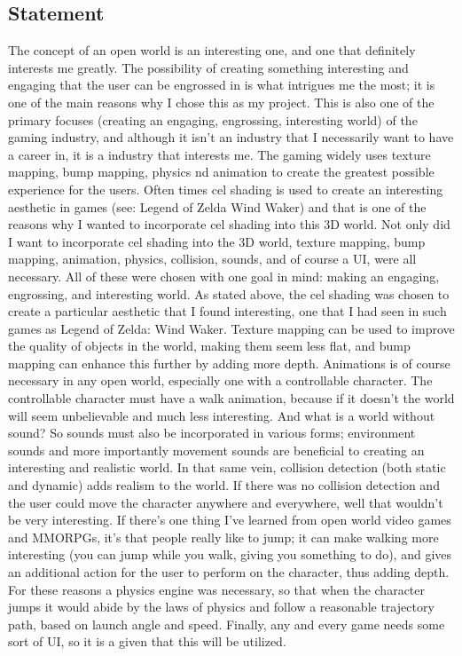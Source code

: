 \documentclass {article}
\begin{document}
\subsection{Statement}
The concept of an open world is an interesting one, and one that definitely interests me greatly. The possibility of creating something interesting and engaging that the user can be engrossed in is what intrigues me the most; it is one of the main reasons why I chose this as my project. This is also one of the primary focuses (creating an engaging, engrossing, interesting world) of the gaming industry, and although it isn't an industry that I necessarily want to have a career in, it is a industry that interests me. The gaming widely uses texture mapping, bump mapping, physics nd animation to create the greatest possible experience for the users. Often times cel shading is used to create an interesting aesthetic in games (see: Legend of Zelda Wind Waker) and that is one of the reasons why I wanted to incorporate cel shading into this 3D world.
\newline
\newline
Not only did I want to incorporate cel shading into the 3D world, texture mapping, bump mapping, animation, physics, collision, sounds, and of course a UI, were all necessary. All of these were chosen with one goal in mind: making an engaging, engrossing, and interesting world. As stated above, the cel shading was chosen to create a particular aesthetic that I found interesting, one that I had seen in such games as Legend of Zelda: Wind Waker. Texture mapping can be used to improve the quality of objects in the world, making them seem less flat, and bump mapping can enhance this further by adding more depth. Animations is of course necessary in any open world, especially one with a controllable character. The controllable character must have a walk animation, because if it doesn't the world will seem unbelievable and much less interesting. And what is a world without sound? So sounds must also be incorporated in various forms; environment sounds and more importantly movement sounds are beneficial to creating an interesting and realistic world. In that same vein, collision detection (both static and dynamic) adds realism to the world. If there was no collision detection and the user could move the character anywhere and everywhere, well that wouldn't be very interesting. If there's one thing I've learned from open world video games and MMORPGs, it's that people really like to jump; it can make walking more interesting (you can jump while you walk, giving you something to do), and gives an additional action for the user to perform on the character, thus adding depth. For these reasons a physics engine was necessary, so that when the character jumps it would abide by the laws of physics and follow a reasonable trajectory path, based on launch angle and speed. Finally, any and every game needs some sort of UI, so it is a given that this will be utilized.
\end{document}
